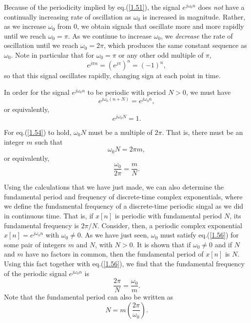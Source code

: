\documentclass[a4paper,10pt,twoside]{book}
\begin{document}
Because of the periodicity implied by eq.\;(\ref{1.51}), the signal $e^{j\omega_0n}$ does \textit{not} have a continually increasing rate of oscillation as $\omega_0$ is increased in magnitude. Rather, as we increase $\omega_0$ from 0, we obtain signals that oscillate more and more rapidly until we reach $\omega_0=\pi$. As we continue to increase $\omega_0$, we \textit{decrease} the rate of oscillation until we reach $\omega_0=2\pi$, which produces the same constant sequence as $\omega_0$. Note in particular that for $\omega_0=\pi$ or any other odd multiple of $\pi$,
\begin{equation}
    e^{j\pi n} = \left(e^{j\pi}\right)^{n} = (-1)^{n},
    \label{1.52}
\end{equation}
so that this signal oscillates rapidly, changing sign at each point in time.

In order for the signal $e^{j\omega_0n}$ to be periodic with period $N>0$, we must have
\begin{equation}
    e^{j\omega_0(n+N)}=e^{j\omega_0n},
    \label{1.53}
\end{equation}
or equivalently,
\begin{equation}
    e^{j\omega_0N}=1.
    \label{1.54}
\end{equation}

For eq.\;(\ref{1.54}) to hold, $\omega_0N$ must be a multiple of $2\pi$. That is, there must be an integer $m$ such that
\begin{equation}
    \omega_0N=2\pi m,
    \label{1.55}
\end{equation}
or equivalently,
\begin{equation}
    \dfrac{\omega_0}{2\pi}=\dfrac{m}{N}.
    \label{1.56}
\end{equation}

Using the calculations that we have just made, we can also determine the fundamental period and frequency of discrete-time complex exponentials, where we define the fundamental frequency of a discrete-time periodic singal as we did in continuous time. That is, if $x[n]$ is periodic with fundamental period $N$, its fundamental frequency is $2\pi/N$. Consider, then, a periodic complex exponential $x[n]=e^{j\omega_0n}$ with $\omega_0\ne 0$. As we have just seen, $\omega_0$ must satisfy eq.\;(\ref{1.56}) for some pair of integers $m$ and $N$, with $N>0$. It is shown that if $\omega_0\ne 0$ and if $N$ and $m$ have no factors in common, then the fundamental period of $x[n]$ is $N$. Using this fact together with eq.\;(\ref{1.56}), we find that the fundamental frequency of the periodic signal $e^{j\omega_0n}$ is
\begin{equation}
    \frac{2\pi}N=\frac{\omega_0}m.
    \label{1.57}
\end{equation}
Note that the fundamental period can also be written as
\begin{equation}
    N = m\left(\frac{2\pi}{\omega_0}\right).
    \label{1.58}
\end{equation}
\end{document}
